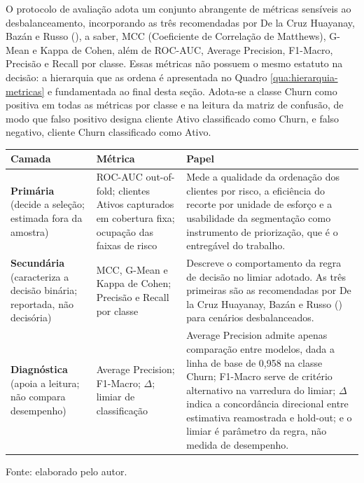 O protocolo de avaliação adota um conjunto abrangente de métricas sensíveis ao desbalanceamento, incorporando as três recomendadas por De la Cruz Huayanay, Bazán e Russo (\citeyear{delacruz2025}), a saber, MCC (Coeficiente de Correlação de Matthews), G-Mean e Kappa de Cohen, além de ROC-AUC, Average Precision, F1-Macro, Precisão e Recall por classe. Essas métricas não possuem o mesmo estatuto na decisão: a hierarquia que as ordena é apresentada no Quadro \ref{qua:hierarquia-metricas} e fundamentada ao final desta seção. Adota-se a classe Churn como positiva em todas as métricas por classe e na leitura da matriz de confusão, de modo que falso positivo designa cliente Ativo classificado como Churn, e falso negativo, cliente Churn classificado como Ativo.

\begin{quadro}[!htb]
\ABNTEXfontereduzida
\SingleSpacing
\caption{Hierarquia das métricas de avaliação segundo o papel na seleção}
\label{qua:hierarquia-metricas}
\centering
\begin{tabular}{|>{\raggedright\arraybackslash}p{2.6cm}|>{\raggedright\arraybackslash}p{5.0cm}|>{\raggedright\arraybackslash}p{6.3cm}|}
\hline
\textbf{Camada} & \textbf{Métrica} & \textbf{Papel} \\
\hline
\textbf{Primária} \newline (decide a seleção; estimada fora da amostra) & ROC-AUC out-of-fold; clientes Ativos capturados em cobertura fixa; ocupação das faixas de risco & Mede a qualidade da ordenação dos clientes por risco, a eficiência do recorte por unidade de esforço e a usabilidade da segmentação como instrumento de priorização, que é o entregável do trabalho. \\
\hline
\textbf{Secundária} \newline (caracteriza a decisão binária; reportada, não decisória) & MCC, G-Mean e Kappa de Cohen; Precisão e Recall por classe & Descreve o comportamento da regra de decisão no limiar adotado. As três primeiras são as recomendadas por De la Cruz Huayanay, Bazán e Russo (\citeyear{delacruz2025}) para cenários desbalanceados. \\
\hline
\textbf{Diagnóstica} \newline (apoia a leitura; não compara desempenho) & Average Precision; F1-Macro; $\Delta$; limiar de classificação & Average Precision admite apenas comparação entre modelos, dada a linha de base de 0,958 na classe Churn; F1-Macro serve de critério alternativo na varredura do limiar; $\Delta$ indica a concordância direcional entre estimativa reamostrada e hold-out; e o limiar é parâmetro da regra, não medida de desempenho. \\
\hline
\end{tabular}
\begin{flushleft}
	\ABNTEXfontereduzida
	\SingleSpacing
	Fonte: elaborado pelo autor.
\end{flushleft}
\end{quadro}

